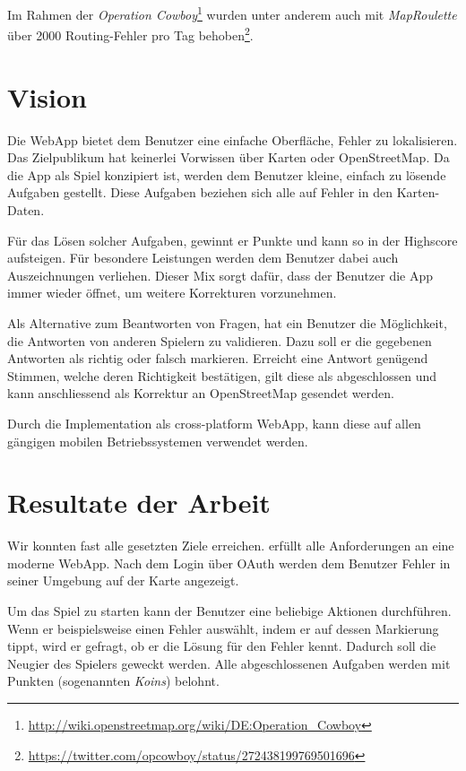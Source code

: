 Im Rahmen der \emph{Operation Cowboy}\footnote{\url{http://wiki.openstreetmap.org/wiki/DE:Operation_Cowboy}} wurden unter anderem auch mit \emph{MapRoulette} über 2000 Routing-Fehler pro Tag behoben\footnote{\url{https://twitter.com/opcowboy/status/272438199769501696}}.

\section{Vision}
Die \gls{WebApp} \kort bietet dem Benutzer eine einfache Oberfläche, Fehler zu lokalisieren.
Das Zielpublikum hat keinerlei Vorwissen über Karten oder \gls{OpenStreetMap}.
Da die App als Spiel konzipiert ist, werden dem Benutzer kleine, einfach zu lösende Aufgaben gestellt.
Diese Aufgaben beziehen sich alle auf Fehler in den Karten-Daten.

Für das Lösen solcher Aufgaben, gewinnt er Punkte und kann so in der Highscore aufsteigen.
Für besondere Leistungen werden dem Benutzer dabei auch Auszeichnungen verliehen.
Dieser Mix sorgt dafür, dass der Benutzer die App immer wieder öffnet, um weitere Korrekturen vorzunehmen.

Als Alternative zum Beantworten von Fragen, hat ein Benutzer die Möglichkeit, die Antworten von anderen Spielern zu validieren.
Dazu soll er die gegebenen Antworten als richtig oder falsch markieren.
Erreicht eine Antwort genügend Stimmen, welche deren Richtigkeit bestätigen, gilt diese als abgeschlossen und kann anschliessend als Korrektur an \gls{OpenStreetMap} gesendet werden.

Durch die Implementation als cross-platform \gls{WebApp}, kann diese auf allen gängigen mobilen Betriebssystemen verwendet werden.

\section{Resultate der Arbeit}
Wir konnten fast alle gesetzten Ziele erreichen.
\kort erfüllt alle Anforderungen an eine moderne \gls{WebApp}.
Nach dem Login über \gls{OAuth} werden dem Benutzer Fehler in seiner Umgebung auf der Karte angezeigt.

Um das Spiel zu starten kann der Benutzer eine beliebige Aktionen durchführen.
Wenn er beispielsweise einen Fehler auswählt, indem er auf dessen Markierung tippt, wird er gefragt, ob er die Lösung für den Fehler kennt.
Dadurch soll die Neugier des Spielers geweckt werden.
Alle abgeschlossenen Aufgaben werden mit Punkten (sogenannten \emph{Koins}) belohnt.

